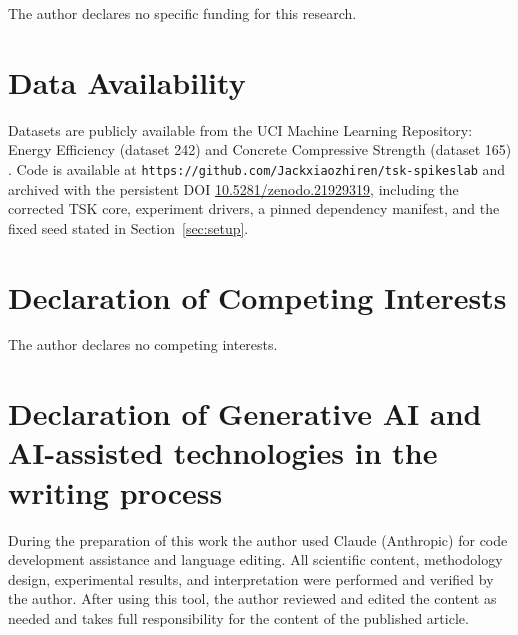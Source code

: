 \documentclass[review,1p,times]{elsarticle}
\begin{document}
The author declares no specific funding for this research.

\section*{Data Availability}

Datasets are publicly available from the UCI Machine Learning Repository: Energy Efficiency (dataset 242) \cite{tsanas2012accurate} and Concrete Compressive Strength (dataset 165) \cite{yeh1998modeling}. Code is available at \texttt{https://github.com/Jackxiaozhiren/tsk-spikeslab} and archived with the persistent DOI \href{https://doi.org/10.5281/zenodo.21929319}{10.5281/zenodo.21929319}, including the corrected TSK core, experiment drivers, a pinned dependency manifest, and the fixed seed stated in Section~\ref{sec:setup}.

\section*{Declaration of Competing Interests}

The author declares no competing interests.

\section*{Declaration of Generative AI and AI-assisted technologies in the writing process}

During the preparation of this work the author used Claude (Anthropic) for code development assistance and language editing. All scientific content, methodology design, experimental results, and interpretation were performed and verified by the author.
After using this tool, the author reviewed and edited the content as needed and takes full responsibility for the content of the published article.



\end{document}
